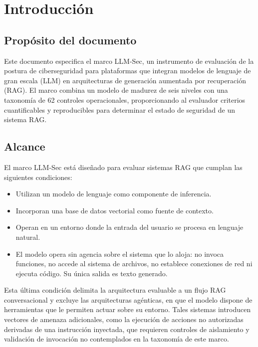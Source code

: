 \chapter{Introducción}
\label{ch:introduccion}

\section{Propósito del documento}

Este documento especifica el marco LLM-Sec, un instrumento de evaluación de la postura de ciberseguridad para plataformas que integran modelos de lenguaje de gran escala (LLM) en arquitecturas de generación aumentada por recuperación (RAG). El marco combina un modelo de madurez de seis niveles con una taxonomía de 62 controles operacionales, proporcionando al evaluador criterios cuantificables y reproducibles para determinar el estado de seguridad de un sistema RAG.

\section{Alcance}
\label{sec:alcance}

El marco LLM-Sec está diseñado para evaluar sistemas RAG que cumplan las siguientes condiciones:

\begin{itemize}[leftmargin=2em]
  \item Utilizan un modelo de lenguaje como componente de inferencia.
  \item Incorporan una base de datos vectorial como fuente de contexto.
  \item Operan en un entorno donde la entrada del usuario se procesa en lenguaje natural.
  \item El modelo opera sin agencia sobre el sistema que lo aloja: no invoca funciones, no accede al sistema de archivos, no establece conexiones de red ni ejecuta código. Su única salida es texto generado.
\end{itemize}

Esta última condición delimita la arquitectura evaluable a un flujo RAG conversacional y excluye las arquitecturas agénticas, en que el modelo dispone de herramientas que le permiten actuar sobre su entorno. Tales sistemas introducen vectores de amenaza adicionales, como la ejecución de acciones no autorizadas derivadas de una instrucción inyectada, que requieren controles de aislamiento y validación de invocación no contemplados en la taxonomía de este marco.

